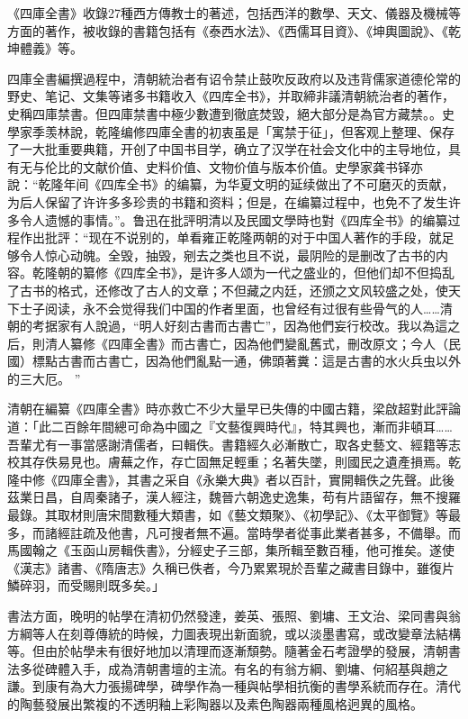 《四庫全書》收錄27種西方傳教士的著述，包括西洋的數學、天文、儀器及機械等方面的著作，被收錄的書籍包括有《泰西水法》、《西儒耳目資》、《坤輿圖說》、《乾坤體義》等。

四庫全書編撰過程中，清朝統治者有诏令禁止鼓吹反政府以及违背儒家道德伦常的野史、笔记、文集等诸多书籍收入《四库全书》，并取締非議清朝統治者的著作，史稱四庫禁書。但四庫禁書中極少數遭到徹底焚毀，絕大部分是為官方藏禁。。史學家季羡林說，乾隆编修四庫全書的初衷虽是「寓禁于征」，但客观上整理、保存了一大批重要典籍，开创了中国书目学，确立了汉学在社会文化中的主导地位，具有无与伦比的文献价值、史料价值、文物价值与版本价值。史學家龚书铎亦說：“乾隆年间《四库全书》的编纂，为华夏文明的延续做出了不可磨灭的贡献，为后人保留了许许多多珍贵的书籍和资料；但是，在编纂过程中，也免不了发生许多令人遗憾的事情。”。鲁迅在批評明清以及民國文學時也對《四库全书》的编纂过程作出批評：“现在不说别的，单看雍正乾隆两朝的对于中国人著作的手段，就足够令人惊心动魄。全毁，抽毁，剜去之类也且不说，最阴险的是删改了古书的内容。乾隆朝的纂修《四库全书》，是许多人颂为一代之盛业的，但他们却不但捣乱了古书的格式，还修改了古人的文章；不但藏之内廷，还颁之文风较盛之处，使天下士子阅读，永不会觉得我们中国的作者里面，也曾经有过很有些骨气的人……清朝的考据家有人說過，“明人好刻古書而古書亡”，因為他們妄行校改。我以為這之后，則清人纂修《四庫全書》而古書亡，因為他們變亂舊式，刪改原文；今人（民國）標點古書而古書亡，因為他們亂點一通，佛頭著糞：這是古書的水火兵虫以外的三大厄。 ” 

清朝在編纂《四庫全書》時亦救亡不少大量早已失傳的中國古籍，梁啟超對此評論道：「此二百餘年間總可命為中國之『文藝復興時代』，特其興也，漸而非頓耳……吾輩尤有一事當感謝清儒者，曰輯佚。書籍經久必漸散亡，取各史藝文、經籍等志校其存佚易見也。膚蕪之作，存亡固無足輕重；名著失墜，則國民之遺產損焉。乾隆中修《四庫全書》，其書之采自《永樂大典》者以百計，實開輯佚之先聲。此後茲業日昌，自周秦諸子，漢人經注，魏晉六朝逸史逸集，苟有片語留存，無不搜羅最錄。其取材則唐宋間數種大類書，如《藝文類聚》、《初學記》、《太平御覽》等最多，而諸經註疏及他書，凡可搜者無不遍。當時學者從事此業者甚多，不備舉。而馬國翰之《玉函山房輯佚書》，分經史子三部，集所輯至數百種，他可推矣。遂使《漢志》諸書、《隋唐志》久稱已佚者，今乃累累現於吾輩之藏書目錄中，雖復片鱗碎羽，而受賜則既多矣。」

書法方面，晚明的帖學在清初仍然發達，姜英、張照、劉墉、王文治、梁同書與翁方綱等人在刻尊傳統的時候，力圖表現出新面貌，或以淡墨書寫，或改變章法結構等。但由於帖學未有很好地加以清理而逐漸頹勢。隨著金石考證學的發展，清朝書法多從碑體入手，成為清朝書壇的主流。有名的有翁方綱、劉墉、何紹基與趙之謙。到康有為大力張揚碑學，碑學作為一種與帖學相抗衡的書學系統而存在。清代的陶藝發展出繁複的不透明釉上彩陶器以及素色陶器兩種風格迥異的風格。

